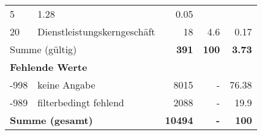 \begin{longtable}{lXrrr}
       \num{5} &
       \num[round-mode=places,round-precision=2]{1,28} &
         \num[round-mode=places,round-precision=2]{0,05} \\

     20 &
     \multicolumn{1}{X}{ Dienstleistungskerngeschäft   } &


       \num{18} &
       \num[round-mode=places,round-precision=2]{4,6} &
         \num[round-mode=places,round-precision=2]{0,17} \\
     \midrule
     \multicolumn{2}{l}{Summe (gültig)} &
       \textbf{\num{391}} &
     \textbf{100} &
       \textbf{\num[round-mode=places,round-precision=2]{3,73}} \\
     \multicolumn{5}{l}{\textbf{Fehlende Werte}}\\
       -998 &
       keine Angabe &
         \num{8015} &
        - &
         \num[round-mode=places,round-precision=2]{76,38} \\
       -989 &
       filterbedingt fehlend &
         \num{2088} &
        - &
         \num[round-mode=places,round-precision=2]{19,9} \\
     \midrule
     \multicolumn{2}{l}{\textbf{Summe (gesamt)}} &
          \textbf{\num{10494}} &
        \textbf{-} &
        \textbf{100} \\
     \bottomrule
     \end{longtable}
     
